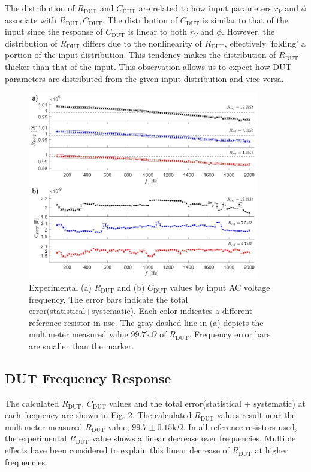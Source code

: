 \documentclass[%
 aip,
 amsmath,amssymb,
 reprint,%
]{revtex4-1}
\begin{document}
The distribution of $R_{\textrm{DUT}}$ and $C_{\textrm{DUT}}$ are related to how input parameters ${r}_V$ and ${\phi}$ associate with $R_{\textrm{DUT}}, C_{\textrm{DUT}}$. The distribution of $C_{\textrm{DUT}}$ is similar to that of the input since the response of $C_{\textrm{DUT}}$ is linear to both ${r}_V$ and ${\phi}$. However, the distribution of $R_{\textrm{DUT}}$ differs due to the nonlinearity of $R_{\textrm{DUT}}$,  effectively 'folding' a portion of the input distribution. This tendency makes the distribution of $R_{\textrm{DUT}}$ thicker than that of the input. This observation allows us to expect how DUT parameters are distributed from the given input distribution and vice versa.


\begin{figure}
    \centering
    \includegraphics[width=0.9\textwidth]{./figures/dut total fig.png}
    \caption{Experimental (a) $R_{\textrm{DUT}}$ and (b) $C_{\textrm{DUT}}$ values by input AC voltage frequency. The error bars indicate the total error(statistical+systematic). Each color indicates a different reference resistor in use. The gray dashed line in (a) depicts the multimeter measured value $99.7\text{k}\Omega$ of $R_{\textrm{DUT}}$. Frequency error bars are smaller than the marker.}
\end{figure}

\subsection{DUT Frequency Response}

The calculated $R_{\textrm{DUT}}$, $C_{\textrm{DUT}}$ values and the total error(statistical + systematic) at each frequency are shown in Fig. 2. The calculated $R_{\textrm{DUT}}$ values result near the multimeter measured $R_{\textrm{DUT}}$ value,  $99.7\pm0.15\text{k}\Omega$. In all reference resistors used, the experimental $R_{\textrm{DUT}}$ value shows a linear decrease over frequencies. Multiple effects have been considered to explain this linear decrease of $R_{\textrm{DUT}}$ at higher frequencies. 
 
\end{document}
